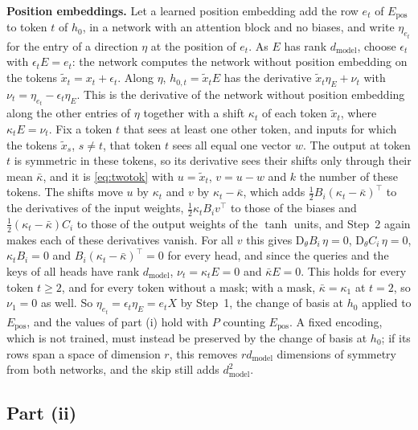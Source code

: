 \documentclass[10pt]{article}
\theoremstyle{definition}
\theoremstyle{remark}
\newcommand{\dm}{d_{\mathrm{model}}}
\newcommand{\Der}{\mathrm{D}}
\newcommand{\para}[1]{\smallskip\noindent\textbf{#1}\hspace{0.5em}}
\begin{document}
\para{Position embeddings.} Let a learned position embedding add the row $e_t$ of $E_{\mathrm{pos}}$ to token $t$ of $h_0$, in a network with an attention block and no biases, and write $\eta_{e_t}$ for the entry of a direction $\eta$ at the position of $e_t$. As $E$ has rank $\dm$, choose $\epsilon_t$ with $\epsilon_tE = e_t$: the network computes the network without position embedding on the tokens $\tilde x_t = x_t + \epsilon_t$. Along $\eta$, $h_{0,t} = \tilde x_tE$ has the derivative $\tilde x_t\eta_E + \nu_t$ with $\nu_t = \eta_{e_t} - \epsilon_t\eta_E$. This is the derivative of the network without position embedding along the other entries of $\eta$ together with a shift $\kappa_t$ of each token $\tilde x_t$, where $\kappa_tE = \nu_t$. Fix a token $t$ that sees at least one other token, and inputs for which the tokens $\tilde x_s$, $s \neq t$, that token $t$ sees all equal one vector $w$. The output at token $t$ is symmetric in these tokens, so its derivative sees their shifts only through their mean $\bar\kappa$, and it is \cref{eq:twotok} with $u = \tilde x_t$, $v = u - w$ and $k$ the number of these tokens. The shifts move $u$ by $\kappa_t$ and $v$ by $\kappa_t - \bar\kappa$, which adds $\tfrac12B_i(\kappa_t - \bar\kappa)^\top$ to the derivatives of the input weights, $\tfrac12\kappa_tB_iv^\top$ to those of the biases and $\tfrac12(\kappa_t - \bar\kappa)C_i$ to those of the output weights of the $\tanh$ units, and Step~2 again makes each of these derivatives vanish. For all $v$ this gives $\Der_\theta B_i\,\eta = 0$, $\Der_\theta C_i\,\eta = 0$, $\kappa_tB_i = 0$ and $B_i(\kappa_t - \bar\kappa)^\top = 0$ for every head, and since the queries and the keys of all heads have rank $\dm$, $\nu_t = \kappa_tE = 0$ and $\bar\kappa E = 0$. This holds for every token $t \ge 2$, and for every token without a mask; with a mask, $\bar\kappa = \kappa_1$ at $t = 2$, so $\nu_1 = 0$ as well. So $\eta_{e_t} = \epsilon_t\eta_E = e_tX$ by Step~1, the change of basis at $h_0$ applied to $E_{\mathrm{pos}}$, and the values of part (i) hold with $P$ counting $E_{\mathrm{pos}}$. A fixed encoding, which is not trained, must instead be preserved by the change of basis at $h_0$; if its rows span a space of dimension $r$, this removes $r\dm$ dimensions of symmetry from both networks, and the skip still adds $\dm^2$.

\subsection*{Part (ii)}
\end{document}

